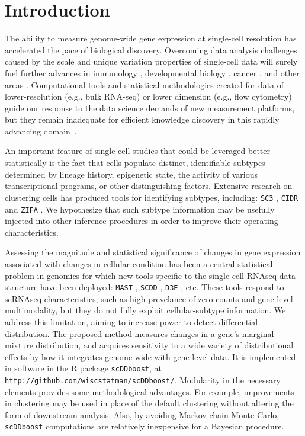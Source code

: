 \documentclass[aoas,preprint]{imsart}
\begin{document}
\begin{frontmatter}
\end{frontmatter}

\section{Introduction}

The ability to measure genome-wide gene expression at single-cell resolution 
has accelerated the pace of biological discovery.  Overcoming data
analysis challenges caused by the scale and unique variation properties of single-cell
data will surely fuel further advances in immunology \citep{immune}, developmental
biology \citep{dv}, cancer \citep{cancer}, and other areas \citep{scs}. 
 Computational tools and statistical methodologies 
created for data of lower-resolution (e.g., bulk RNA-seq) or lower dimension 
(e.g., flow cytometry)  guide our response to 
 the data science demands of new measurement platforms,
but they remain inadequate for efficient knowledge discovery in this
rapidly advancing domain~\citep{Bacher2016}.

An important feature of single-cell studies that could be leveraged better
statistically is the fact that cells populate distinct, identifiable subtypes
determined by lineage history, epigenetic state, the activity
of various transcriptional programs, or other 
distinguishing factors. Extensive research on clustering cells
has produced tools for identifying subtypes, including: 
 \verb+SC3+ \citep{sc3}, \verb+CIDR+ \citep{CIDR} and \verb+ZIFA+ \citep{ZIFA}.
We hypothesize that such
subtype information may be usefully injected into other inference procedures in order
to improve their operating characteristics. 

Assessing the magnitude and statistical significance of changes in gene
expression associated with changes in cellular condition has been a central
statistical problem in genomics for which new tools specific to
the single-cell RNAseq data structure have been deployed: \verb+MAST+ \citep{ref:MAST},
\verb+SCDD+ \citep{ref:scDD}, \verb+D3E+ \citep{ref:d3e}, etc.  These tools respond
to scRNAseq characteristics, such as high prevelance of zero counts and
gene-level multimodality, but they do not fully exploit cellular-subtype
information.  We address this limitation, aiming to increase power to detect differential distribution.
The proposed method measures changes in a gene's marginal mixture distribution, and
acquires sensitivity  to a wide variety of distributional effects by how it integrates genome-wide with
gene-level data.  It is implemented in  software 
in the R package \verb+scDDboost+, at \verb+http://github.com/wiscstatman/scDDboost/+.
Modularity in the necessary elements provides some methodological advantages. For example,
improvements in clustering may be used in place of the default clustering
without altering the form of downstream analysis.  Also, by avoiding Markov chain Monte Carlo,
\verb+scDDboost+ computations are relatively inexpensive for a Bayesian procedure.
\end{document}
